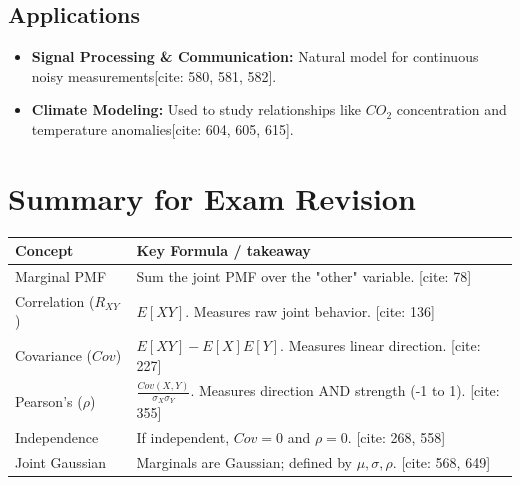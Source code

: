 \documentclass[11pt]{article}
\begin{document}
\subsection{Applications}
\begin{itemize}
    \item \textbf{Signal Processing \& Communication:} Natural model for continuous noisy measurements[cite: 580, 581, 582].
    \item \textbf{Climate Modeling:} Used to study relationships like $CO_{2}$ concentration and temperature anomalies[cite: 604, 605, 615].
\end{itemize}

\section*{Summary for Exam Revision}
\begin{table}[h!]
\centering
\begin{tabular}{|l|l|}
\hline
\textbf{Concept} & \textbf{Key Formula / takeaway} \\ \hline
Marginal PMF & Sum the joint PMF over the "other" variable. [cite: 78] \\ \hline
Correlation ($R_{XY}$) & $E[XY]$. Measures raw joint behavior. [cite: 136] \\ \hline
Covariance ($Cov$) & $E[XY] - E[X]E[Y]$. Measures linear direction. [cite: 227] \\ \hline
Pearson's ($\rho$) & $\frac{Cov(X,Y)}{\sigma_X \sigma_Y}$. Measures direction AND strength (-1 to 1). [cite: 355] \\ \hline
Independence & If independent, $Cov=0$ and $\rho=0$. [cite: 268, 558] \\ \hline
Joint Gaussian & Marginals are Gaussian; defined by $\mu, \sigma, \rho$. [cite: 568, 649] \\ \hline
\end{tabular}
\end{table}
\end{document}
